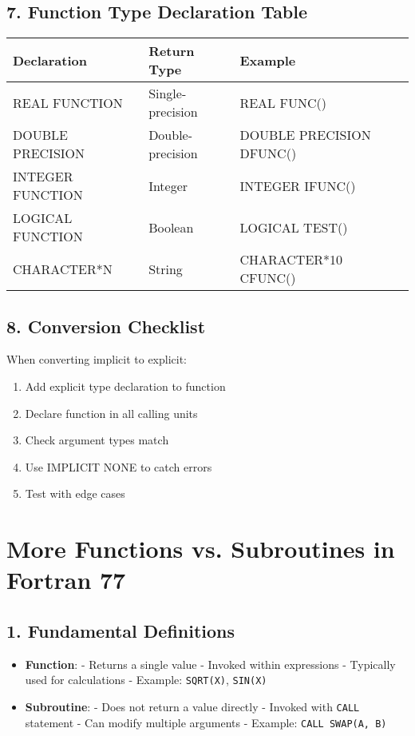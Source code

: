 \documentclass{book}
\begin{document}
\subsection*{7. Function Type Declaration Table}
\begin{center}
\begin{tabular}{|l|l|l|}
\hline
\textbf{Declaration} & \textbf{Return Type} & \textbf{Example} \\ 
\hline
REAL FUNCTION & Single-precision & REAL FUNC() \\
DOUBLE PRECISION & Double-precision & DOUBLE PRECISION DFUNC() \\
INTEGER FUNCTION & Integer & INTEGER IFUNC() \\
LOGICAL FUNCTION & Boolean & LOGICAL TEST() \\
CHARACTER*N & String & CHARACTER*10 CFUNC() \\
\hline
\end{tabular}
\end{center}

\subsection*{8. Conversion Checklist}
When converting implicit to explicit:
\begin{enumerate}
\item Add explicit type declaration to function
\item Declare function in all calling units
\item Check argument types match
\item Use IMPLICIT NONE to catch errors
\item Test with edge cases
\end{enumerate}

\section{More Functions vs. Subroutines in Fortran 77}

\subsection*{1. Fundamental Definitions}
\begin{itemize}
\item \textbf{Function}:
  - Returns a single value
  - Invoked within expressions
  - Typically used for calculations
  - Example: \texttt{SQRT(X)}, \texttt{SIN(X)}

\item \textbf{Subroutine}:
  - Does not return a value directly
  - Invoked with \texttt{CALL} statement
  - Can modify multiple arguments
  - Example: \texttt{CALL SWAP(A, B)}
\end{itemize}
\end{document}
